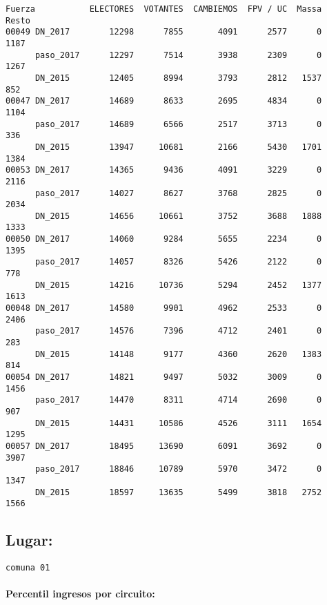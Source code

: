 \documentclass[11pt]{article}
\begin{document}
    \begin{verbatim}
Fuerza           ELECTORES  VOTANTES  CAMBIEMOS  FPV / UC  Massa  Resto
00049 DN_2017        12298      7855       4091      2577      0   1187
      paso_2017      12297      7514       3938      2309      0   1267
      DN_2015        12405      8994       3793      2812   1537    852
00047 DN_2017        14689      8633       2695      4834      0   1104
      paso_2017      14689      6566       2517      3713      0    336
      DN_2015        13947     10681       2166      5430   1701   1384
00053 DN_2017        14365      9436       4091      3229      0   2116
      paso_2017      14027      8627       3768      2825      0   2034
      DN_2015        14656     10661       3752      3688   1888   1333
00050 DN_2017        14060      9284       5655      2234      0   1395
      paso_2017      14057      8326       5426      2122      0    778
      DN_2015        14216     10736       5294      2452   1377   1613
00048 DN_2017        14580      9901       4962      2533      0   2406
      paso_2017      14576      7396       4712      2401      0    283
      DN_2015        14148      9177       4360      2620   1383    814
00054 DN_2017        14821      9497       5032      3009      0   1456
      paso_2017      14470      8311       4714      2690      0    907
      DN_2015        14431     10586       4526      3111   1654   1295
00057 DN_2017        18495     13690       6091      3692      0   3907
      paso_2017      18846     10789       5970      3472      0   1347
      DN_2015        18597     13635       5499      3818   2752   1566
    \end{verbatim}

    
    \hypertarget{lugar}{%
\subsection{Lugar:}\label{lugar}}

    
    \begin{Verbatim}[commandchars=\\\{\}]
comuna 01

    \end{Verbatim}

    \hypertarget{percentil-ingresos-por-circuito}{%
\paragraph{Percentil ingresos por
circuito:}\label{percentil-ingresos-por-circuito}}
\end{document}
